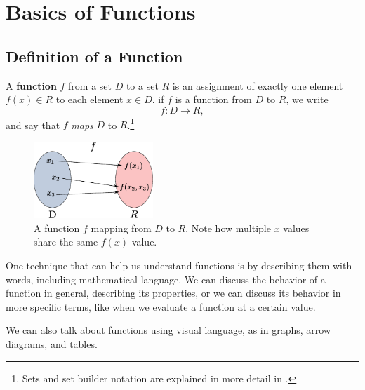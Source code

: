 \chapter{Basics of Functions}
\section{Definition of a Function}
\begin{defn}
    A \textbf{function} $f$ from a set $D$ to a set $R$ is an assignment of exactly one element $f(x) \in R$ to each element $x \in D$.
    if $f$ is a function from $D$ to $R$, we write
    \begin{equation}
        f:D \to R,
        \label{eq:function_definition}
    \end{equation}
    and say that $f$ \emph{maps} $D$ to $R$.\footnote{Sets and set builder notation are explained in more detail in .}
\end{defn}
\begin{figure}[h]
    \centering
    \includegraphics[width=0.4\textwidth]{continuous/functions/function.eps}
    \caption{A function $f$ mapping from $D$ to $R$. Note how multiple $x$ 
        values share the same $f(x)$ value.}
    \label{fig:function}
\end{figure}

One technique that can help us understand functions is by describing them with words,
including mathematical language.
We can discuss the behavior of a function in general,
describing its properties, or we can discuss its behavior in more specific terms,
like when we evaluate a function at a certain value.

We can also talk about functions using visual language, as in graphs, arrow 
diagrams, and tables.


